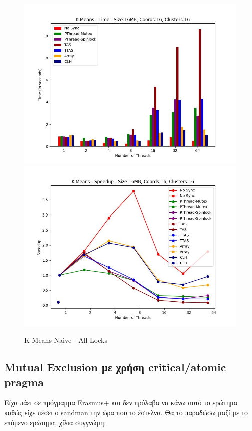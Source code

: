 \documentclass[letterpaper,12pt]{article}
\begin{document}
\begin{figure}[H]
    \centering
        \includegraphics[scale=0.4]{outFilesCores/plots/kmeans_locks_all.jpg}
        \includegraphics[scale=0.4]{outFilesCores/plots/kmeans_locks_all_speedup.jpg}
    \caption{K-Means Naive - All Locks}
    \label{fig:K-Means Naive - All Locks}
\end{figure}


\subsection{Mutual Exclusion με χρήση critical/atomic pragma}

Είχα πάει σε πρόγραμμα Erasmus+ και δεν πρόλαβα να κάνω αυτό το ερώτημα καθώς είχε πέσει ο sandman την ώρα που το έστελνα.
Θα το παραδώσω μαζί με το επόμενο ερώτημα, χίλια συγγνώμη.
\end{document}
